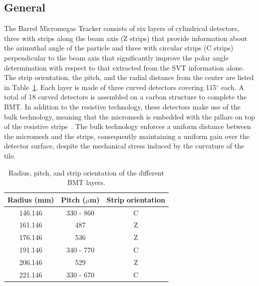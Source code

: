 \subsection{General}

The Barrel Micromegas Tracker consists of six layers of cylindrical detectors, three with strips along the beam axis
(Z strips) that provide information about the azimuthal angle of the particle and three with circular strips (C strips)
perpendicular to the beam axis that significantly improve the polar angle determination with respect to that extracted
from the SVT information alone. The strip orientation, the pitch, and the radial distance from the center are listed in 
Table~\ref{tab:bmt_strips}. Each layer is made of three curved detectors covering 115$^\circ$ each. A total of 18 
curved detectors is assembled on a carbon structure to complete the BMT. In addition to the resistive technology, 
these detectors make use of the bulk technology, meaning that the micromesh is embedded with the pillars on top of the 
resistive strips~\cite{GIOMATARIS2006405}. The bulk technology enforces a uniform distance between the micromesh
and the strips, consequently maintaining a uniform gain over the detector surface, despite the mechanical stress induced
by the curvature of the tile.

\begin{table}
    \centering
    \begin{tabular}{|c|c|c|}
    \hline
    Radius (mm) & Pitch ($\mu$m) & Strip orientation \\
    \hline
    146.146 & 330 - 860 & C \\
    161.146 & 487 & Z \\
    176.146 & 536 & Z \\
    191.146 & 340 - 770 & C \\
    206.146 & 529 & Z \\
    221.146 & 330 - 670 & C \\
    \hline
    \end{tabular}
    \caption{Radius, pitch, and strip orientation of the different BMT layers.}
    \label{tab:bmt_strips}
\end{table}

